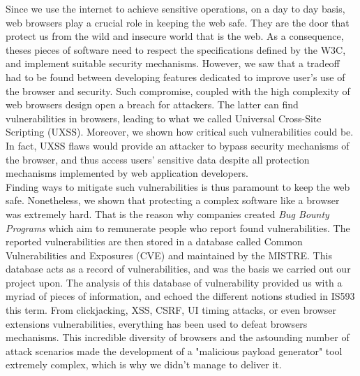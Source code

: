 \documentclass[journal]{IEEEtran}
\begin{document}
Since we use the internet to achieve sensitive operations, on a day to day basis, web browsers play a crucial role in keeping the web safe. They are the door that protect us from the wild and insecure world that is the web. As a consequence, theses pieces of software need to respect the specifications defined by the W3C, and implement suitable security mechanisms. However, we saw that a tradeoff had to be found between developing features dedicated to improve user's use of the browser and security. Such compromise, coupled with the high complexity of web browsers design open a breach for attackers. The latter can find vulnerabilities in browsers, leading to what we called Universal Cross-Site Scripting (UXSS). Moreover, we shown how critical such vulnerabilities could be. In fact, UXSS flaws would provide an attacker to bypass security mechanisms of the browser, and thus access users' sensitive data despite all protection mechanisms implemented by web application developers. \\
Finding ways to mitigate such vulnerabilities is thus paramount to keep the web safe. Nonetheless, we shown that protecting a complex software like a browser was extremely hard. That is the reason why companies created \emph{Bug Bounty Programs} which aim to remunerate people who report found vulnerabilities. The reported vulnerabilities are then stored in a database called Common Vulnerabilities and Exposures (CVE) and maintained by the MISTRE. This database acts as a record of vulnerabilities, and was the basis we carried out our project upon. The analysis of this database of vulnerability provided us with a myriad of pieces of information, and echoed the different notions studied in IS593 this term. From clickjacking, XSS, CSRF, UI timing attacks, or even browser extensions vulnerabilities, everything has been used to defeat browsers mechanisms. This incredible diversity of browsers and the astounding number of attack scenarios made the development of a "malicious payload generator" tool extremely complex, which is why we didn't manage to deliver it.

\medskip
\end{document}
